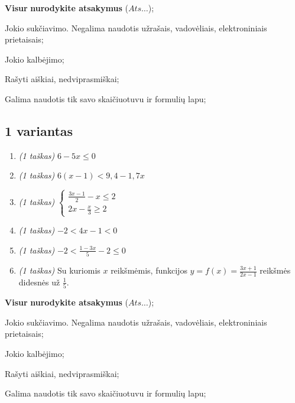 \documentclass[a4paper]{article}
\begin{document}
\begin{small}
      \begin{enumerate*}[label={(\arabic*)}]
            \item \textbf{Visur} \textbf{nurodykite atsakymus} ($Ats\ldots$);
            \item Jokio sukčiavimo. Negalima naudotis užrašais, vadovėliais,
            elektroniniais prietaisais;
            \item Jokio kalbėjimo;
            \item Rašyti aiškiai, nedviprasmiškai;
            \item Galima naudotis tik savo skaičiuotuvu ir formulių lapu;
      \end{enumerate*}
\end{small}

\vspace*{3mm}

\subsection*{1 variantas}

\begin{enumerate}
      \item \textit{(1 taškas)} $6-5x \leqslant 0$
      \item \textit{(1 taškas)} $6(x-1) < 9,4 - 1,7x$
      \item \textit{(1 taškas)}
      \(
      \left\{\begin{matrix}
            \frac{3x-1}{2}-x \leqslant 2 \\
            2x - \frac{x}{3} \geqslant 2
      \end{matrix}\right.
      \)
      \item \textit{(1 taškas)} $-2<4x-1<0$
      \item \textit{(1 taškas)} $-2 < \frac{1-3x}{5}-2 \leqslant 0$
      \item \textit{(1 taškas)} Su kuriomis $x$ reikšmėmis, funkcijos $y=f(x)=\frac{3x+1}{2x-1}$ reikšmės didesnės už $\frac{1}{5}$.
\end{enumerate}

\begin{small}
      \begin{enumerate*}[label={(\arabic*)}]
            \item \textbf{Visur} \textbf{nurodykite atsakymus} ($Ats\ldots$);
            \item Jokio sukčiavimo. Negalima naudotis užrašais, vadovėliais,
            elektroniniais prietaisais;
            \item Jokio kalbėjimo;
            \item Rašyti aiškiai, nedviprasmiškai;
            \item Galima naudotis tik savo skaičiuotuvu ir formulių lapu;
      \end{enumerate*}
\end{small}
            
\end{document}
